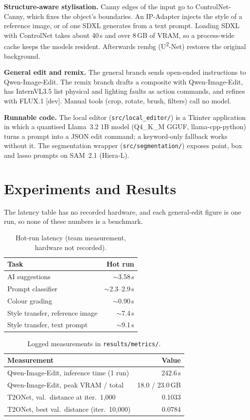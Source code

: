 \documentclass[10pt,twocolumn,a4paper]{article}
\begin{document}
\textbf{Structure-aware stylisation.} Canny edges of the input go to ControlNet-Canny, which fixes the object's boundaries. An IP-Adapter injects the style of a reference image, or of one SDXL generates from a text prompt. Loading SDXL with ControlNet takes about 40\,s and over 8\,GB of VRAM, so a process-wide cache keeps the models resident. Afterwards rembg (U\textsuperscript{2}-Net) restores the original background.

\textbf{General edit and remix.} The general branch sends open-ended instructions to Qwen-Image-Edit. The remix branch drafts a composite with Qwen-Image-Edit, has InternVL3.5 list physical and lighting faults as action commands, and refines with FLUX.1 [dev]. Manual tools (crop, rotate, brush, filters) call no model.

\textbf{Runnable code.} The local editor (\texttt{src/local\_editor/}) is a Tkinter application in which a quantised Llama~3.2 1B model (Q4\_K\_M GGUF, llama-cpp-python) turns a prompt into a JSON edit command; a keyword-only fallback works without it. The segmentation wrapper (\texttt{src/segmentation/}) exposes point, box and lasso prompts on SAM~2.1 (Hiera-L).

\section{Experiments and Results}
The latency table has no recorded hardware, and each general-edit figure is one run, so none of these numbers is a benchmark.

\begin{table}[h]
\centering
\small
\caption{Hot-run latency (team measurement, hardware not recorded).}
\label{tab:latency}
\begin{tabular}{@{}lr@{}}
\toprule
Task & Hot run \\
\midrule
AI suggestions & $\sim$3.58\,s \\
Prompt classifier & $\sim$2.3--2.9\,s \\
Colour grading & $\sim$0.90\,s \\
Style transfer, reference image & $\sim$7.4\,s \\
Style transfer, text prompt & $\sim$9.1\,s \\
\bottomrule
\end{tabular}
\end{table}

\begin{table}[h]
\centering
\small
\caption{Logged measurements in \texttt{results/metrics/}.}
\label{tab:logs}
\begin{tabular}{@{}l@{\hspace{10pt}}r@{}}
\toprule
Measurement & Value \\
\midrule
Qwen-Image-Edit, inference time (1 run) & 242.6\,s \\
Qwen-Image-Edit, peak VRAM / total & 18.0 / 23.0\,GB \\
T2ONet, val.\ distance at iter.\ 1,000 & 0.1033 \\
T2ONet, best val.\ distance (iter.\ 10,000) & 0.0784 \\
\bottomrule
\end{tabular}
\end{table}
\end{document}
